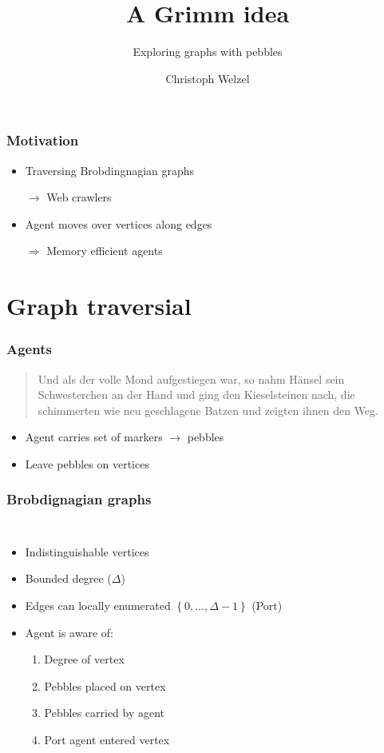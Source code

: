 \documentclass{beamer}
\title{A Grimm idea}
\subtitle{Exploring graphs with pebbles}
\author{Christoph Welzel}
\institute{Logik und Theorie diskreter Systeme, RWTH Aachen}
\begin{document}
\maketitle
\begin{frame}
  \frametitle{Motivation}
  \begin{itemize}
    \item Traversing Brobdingnagian graphs
    \item[$\rightarrow$] Web crawlers
    \item Agent moves over vertices along edges
    \item[$\Rightarrow$] Memory efficient agents
  \end{itemize}
\end{frame}

\section{Graph traversial}
\begin{frame}
  \frametitle{Agents}
  \begin{quotation}
    Und als der volle Mond aufgestiegen war, so nahm Hänsel sein
    Schwesterchen an der Hand und ging den Kieselsteinen nach, die schimmerten
    wie neu geschlagene Batzen und zeigten ihnen den Weg.
  \end{quotation}
  \vspace{-0.5cm}
  \vspace{-0.5cm}
  \begin{itemize}
    \item Agent carries set of markers $\rightarrow$ pebbles
    \item Leave pebbles on vertices
  \end{itemize}
\end{frame}

\begin{frame}
  \frametitle{Brobdignagian graphs}
  \begin{columns}
    \begin{itemize}
      \item Indistinguishable vertices
      \item Bounded degree ($\Delta$)
      \item Edges can locally enumerated $\left\{0,\dots,\Delta-1\right\}$
        (Port)
      \item Agent is aware of:
        \begin{enumerate}
          \item Degree  of vertex
          \item Pebbles placed on vertex
          \item Pebbles carried by agent
          \item Port    agent entered vertex
        \end{enumerate}
    \end{itemize}
    \begin{center}
    \end{center}
  \end{columns}
\end{frame}
\end{document}
